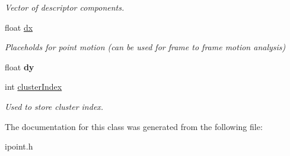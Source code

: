 \begin{DoxyCompactItemize}
\begin{DoxyCompactList}\small\item\em Vector of descriptor components. \end{DoxyCompactList}\item 
\hypertarget{classIpoint_af050aa2895a2d948dcf55e8a37a1fe81}{float \hyperlink{classIpoint_af050aa2895a2d948dcf55e8a37a1fe81}{dx}}\label{classIpoint_af050aa2895a2d948dcf55e8a37a1fe81}

\begin{DoxyCompactList}\small\item\em Placeholds for point motion (can be used for frame to frame motion analysis) \end{DoxyCompactList}\item 
\hypertarget{classIpoint_ab970e99fe7967de3e35e4dddb5d4f927}{float {\bfseries dy}}\label{classIpoint_ab970e99fe7967de3e35e4dddb5d4f927}

\item 
\hypertarget{classIpoint_a85f351954a7d9156d574debc3797b2f8}{int \hyperlink{classIpoint_a85f351954a7d9156d574debc3797b2f8}{cluster\-Index}}\label{classIpoint_a85f351954a7d9156d574debc3797b2f8}

\begin{DoxyCompactList}\small\item\em Used to store cluster index. \end{DoxyCompactList}\end{DoxyCompactItemize}


The documentation for this class was generated from the following file\-:\begin{DoxyCompactItemize}
\item 
ipoint.\-h\end{DoxyCompactItemize}
